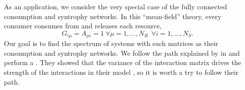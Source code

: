 \documentclass[12pt, titlepage]{report}
\begin{document}
As an application, we consider the very special case of the fully connected consumption and syntrophy networks. In this ``mean-field'' theory, every consumer consumes from and releases each resource, \ie
\begin{equation}
G_{i\mu}=A_{\mu i}=1 \ \forall \mu=1, \dots, N_R \ \ \forall i=1, \dots, N_S.
\end{equation}
Our goal is to find the spectrum of systems with such matrices as their consumption and syntrophy networks.
We follow the path explained by \citeauthor{barbier_cavity_2017} in \cite{barbier_cavity_2017} and perform a . They showed that the variance of the interaction matrix drives the strength of the interactions in their model \cite{barbier_cavity_2017}, so it is worth a try to follow their path.
\end{document}
